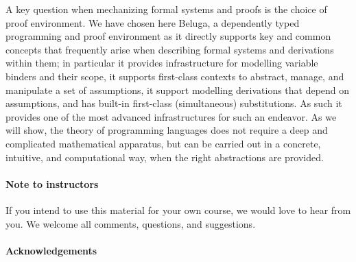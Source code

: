A key question when mechanizing formal systems and proofs is the choice of proof environment.  We have chosen here Beluga, a dependently typed programming and proof environment as it directly supports key and common concepts that frequently arise when describing formal systems and derivations within them; in particular it provides infrastructure for modelling variable binders and their scope, it supports first-class contexts to abstract, manage, and manipulate a set of assumptions, it support modelling derivations that depend on assumptions, and has built-in first-class (simultaneous) substitutions.  As such it provides one of the most advanced infrastructures for such an endeavor. As we will show,  the theory of programming languages does
not require a deep and complicated mathematical apparatus, but can be carried out in a concrete, intuitive, and computational way, when the right abstractions are provided.



\paragraph{Note to instructors}
If you intend to use this material for your own course, we would love to hear from you. We welcome all comments, questions, and suggestions.

\paragraph{Acknowledgements}

